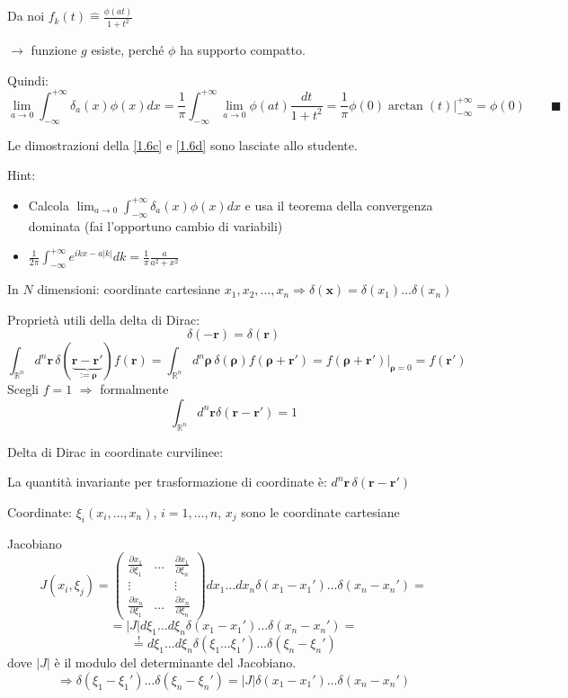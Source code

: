 \documentclass[a4paper,11pt]{report}
\newcommand{\vect}[1]{\boldsymbol{#1}}
\newcommand{\R}{\mathbb{R}}
\newcommand{\x}{\boldsymbol{x}}
\begin{document}
Da noi $f_k(t)\hat{=}\frac{\phi(at)}{1+t^2}$

$\rightarrow$ funzione $g$ esiste, perch\'e $\phi$ ha supporto compatto.

Quindi:
\[
\lim_{a\to 0}\int_{-\infty}^{+\infty}\delta_a(x)\phi(x)dx=\frac{1}{\pi}\int_{-\infty}^{+\infty} \lim_{a\to 0} \phi(at) \frac{dt}{1+t^2}=\frac{1}{\pi} \phi(0) \arctan{(t)}\Big|_{-\infty}^{+\infty}=\phi(0) \qquad \blacksquare
\]

Le dimostrazioni della \eqref{1.6c} e \eqref{1.6d} sono lasciate allo studente.

Hint:
\begin{itemize}
\item Calcola $\lim_{a\to 0}\int_{-\infty}^{+\infty}\delta_a(x)\phi(x)dx$ e usa il teorema della convergenza dominata (fai l'opportuno cambio di variabili)
\item $\frac{1}{2\pi}\int^{+\infty}_{-\infty} e^{ikx-a|k|}dk = \frac{1}{\pi}\frac{a}{a^2+x^2}$ 
\end{itemize}

\medskip

In $N$ dimensioni: coordinate cartesiane $x_1,x_2,\dots,x_n \Rightarrow \delta(\x)= \delta(x_1)\dots \delta(x_n)$

\medspace

Propriet\`a utili della delta di Dirac:
\[
\delta(-\boldsymbol{r})=\delta(\boldsymbol{r})
\]
\begin{equation}
\int_{\R^n} d^n\vect{r}\,\delta(\underbrace{\vect{r}-\vect{r}'}_{:=\vect{\rho}})f(\boldsymbol{r}) =
\int_{\R^n}d^n\vect{\rho}\,\delta(\vect{\rho})f(\vect{\rho}+\vect{r}')=
f(\vect{\rho}+\vect{r}')\Big |_{ \vect{\rho}=0}  = f(\vect{r}')
\label{1.7}
\end{equation}
Scegli $f=1$ $\Rightarrow$ formalmente 
\begin{equation}
\int_{\R^n}d^n\vect{r}\delta(\vect{r}-\vect{r}')=1
\end{equation}

\medspace

Delta di Dirac in coordinate curvilinee:

La quantit\`a invariante per trasformazione di coordinate \`e: $d^n\vect{r}\,\delta(\vect{r}-\vect{r}')$

Coordinate: $\xi_i (x_i,\dots,x_n)$, $i=1,\dots,n$, $x_j$ sono le coordinate cartesiane

Jacobiano
\[
J(x_i,\xi_j)=\left(\begin{matrix}
\frac{\partial x_1}{\partial \xi_1} & \dots & \frac{\partial x_1}{\partial \xi_n}\\
\vdots & & \vdots \\
\frac{\partial x_n}{\partial \xi_1} & \dots &\frac{\partial x_n}{\partial \xi_n}
\end{matrix}\right)dx_1\dots dx_n \delta(x_1-x_1')\dots \delta(x_n - x_n')=
\]
\[
=|J|d\xi_1\dots d\xi_n \delta(x_1 - x_1')\dots \delta(x_n-x_n')=
\]
\[
\overset{!}{=}d\xi_1 \dots d\xi_n\delta(\xi_1\dots \xi_1')\dots \delta(\xi_n - \xi_n')
\]
dove $|J|$ \`e il modulo del determinante del Jacobiano.
\begin{equation}
\Rightarrow\delta(\xi_1-\xi_1')\dots\delta(\xi_n-\xi_n')=|J|\delta(x_1-x_1')\dots\delta(x_n-x_n')
\end{equation}
\end{document}
